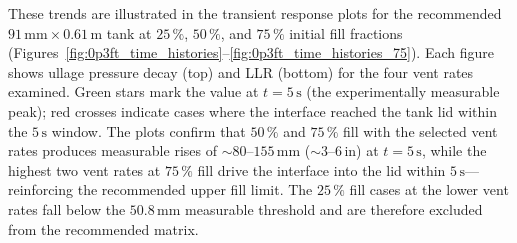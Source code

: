 \documentclass[conf]{new-aiaa}
\begin{document}
These trends are illustrated in the transient response plots for the recommended $91\,\text{mm} \times 0.61\,\text{m}$ tank at $25\,\%$, $50\,\%$, and $75\,\%$ initial fill fractions (Figures~\ref{fig:0p3ft_time_histories}--\ref{fig:0p3ft_time_histories_75}). Each figure shows ullage pressure decay (top) and LLR (bottom) for the four vent rates examined. Green stars mark the value at $t = 5\,\text{s}$ (the experimentally measurable peak); red crosses indicate cases where the interface reached the tank lid within the $5\,\text{s}$ window. The plots confirm that $50\,\%$ and $75\,\%$ fill with the selected vent rates produces measurable rises of $\sim 80$--$155\,\text{mm}$ ($\sim 3$--$6\,\text{in}$) at $t = 5\,\text{s}$, while the highest two vent rates at $75\,\%$ fill drive the interface into the lid within $5\,\text{s}$---reinforcing the recommended upper fill limit. The $25\,\%$ fill cases at the lower vent rates fall below the $50.8\,\text{mm}$ measurable threshold and are therefore excluded from the recommended matrix.


\end{document}
